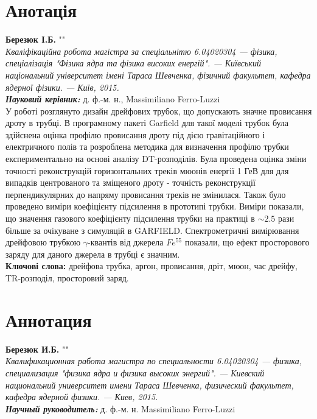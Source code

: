 \newpage

\section*{Анотація}

  {\bf Березюк І.Б.} "\thesistopicUA"\\
  {\itshape Кваліфікаційна робота магістра за спеціальнітю 6.04020304 --- фізика, спеціалізація "Фізика ядра та фізика високих енергій". --- Київський національний університет імені Тараса Шевченка, фізичний факультет, кафедра ядерної фізики. --- Київ, 2015.\\}
  {\itshape \bfseries Науковий керівник:} д. ф.-м. н., Massimiliano  Ferro-Luzzi \\%

	У роботі розглянуто дизайн дрейфових трубок, що допускають значне провисання дроту в трубці. В програмному пакеті Garfield для такої моделі трубок була здійснена оцінка профілю провисання дроту під дією гравітаційного і електричного полів та розроблена методика для визначення профілю трубки експериментально на основі аналізу DT-розподілів. Була проведена оцінка зміни точності реконструкцій горизонтальних треків мюонів енергії 1 ГеВ  для для випадків центрованого та зміщеного дроту - точність реконструкції перпендикулярних до напряму провисання треків не змінилася. Також було проведено виміри коефіцієнту підсилення в прототипі трубки. Виміри показали, що значення газового коефіцієнту підсилення трубки на практиці в $\sim 2.5$ рази більше за очікуване з симуляцій в GARFIELD. Спектрометричні вимірювання дрейфовою трубкою $\gamma$-квантів від джерела $Fe^{55}$ показали, що ефект просторового заряду для даного джерела в трубці є значним.
   \\[0.5cm]
  {\bf Ключові слова:} дрейфова трубка, аргон, провисання, дріт, мюон, час дрейфу, TR-розподіл, просторовий заряд.\\

\section*{Аннотация}

  {\bf Березюк И.Б.} "\thesistopicRU"\\
  {\itshape Квалификационная работа магистра по специальности 6.04020304 --- физика, специализация "физика ядра и физика высоких энергий". --- Киевский национальний университет имени Тараса Шевченка, физический факультет, кафедра ядерной физики. --- Киев, 2015.\\}
  {\itshape \bfseries Научный руководитель:}  д. ф.-м. н. Massimiliano  Ferro-Luzzi\\%

